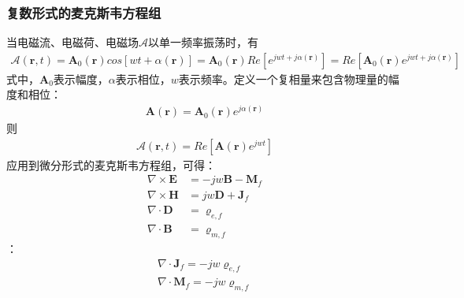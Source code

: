\documentclass{article}
\numberwithin{equation}{section}
\renewcommand{\vec}[1]{\boldsymbol{#1}}
\begin{document}
\subsubsection{复数形式的麦克斯韦方程组}
当电磁流、电磁荷、电磁场$\vec{\mathcal{A}}$以单一频率振荡时，有
\begin{align}
    \vec{\mathcal{A}}(\vec{r},t)=\mathbf{A}_0(\vec{r})cos[wt+\alpha (\vec{r})]=\mathbf{A}_0(\vec{r})Re[e^{jwt+j\alpha (\vec{r})}]=Re[\mathbf{A}_0(\vec{r})e^{jwt+j\alpha (\vec{r})}]
\end{align}
式中，$\mathbf{A}_0$表示幅度，$\alpha$表示相位，$w$表示频率。定义一个复相量来包含物理量的幅度和相位：
\begin{align}
    \mathbf{A}(\vec{r})=\mathbf{A}_0(\vec{r})e^{j\alpha (\vec{r})}
\end{align}
则
\begin{align}
    \vec{\mathcal{A}}(\vec{r},t)=Re[\mathbf{A}(\vec{r})e^{jwt}]
\end{align}
应用到微分形式的麦克斯韦方程组，可得\textbf{\color{blue}{麦克斯韦方程组的复数形式}}：
\begin{align}
    \label{eq:eq43}
    \nabla \times \mathbf{E}&=-jw\mathbf{B}-\mathbf{M}_f \\
    \label{eq:eq44}
    \nabla \times \mathbf{H}&=jw\mathbf{D}+\mathbf{J}_{f} \\
    \label{eq:eq45}
    \nabla \cdot \mathbf{D}&=\varrho _{e,f} \\
    \label{eq:eq46}
    \nabla \cdot \mathbf{B}&=\varrho _{m,f}
\end{align}
\textbf{\color{blue}{电流连续性方程的复数形式}}：
\begin{align}
    \nabla \cdot \mathbf{J}_{f}=-jw\varrho _{e,f} \\
    \nabla \cdot \mathbf{M}_{f}=-jw\varrho _{m,f}
\end{align}
\end{document}
